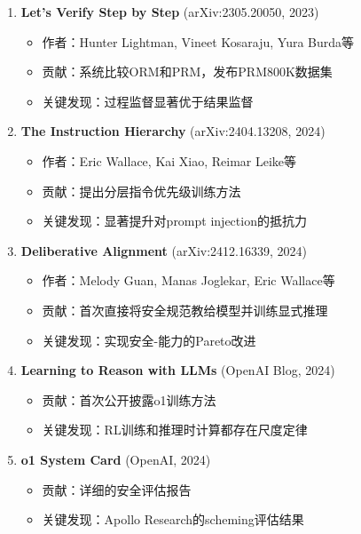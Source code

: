 \documentclass[12pt,a4paper]{article}
\begin{document}
\begin{enumerate}
    \item \textbf{Let's Verify Step by Step} (arXiv:2305.20050, 2023)
    \begin{itemize}
        \item 作者：Hunter Lightman, Vineet Kosaraju, Yura Burda等
        \item 贡献：系统比较ORM和PRM，发布PRM800K数据集
        \item 关键发现：过程监督显著优于结果监督
    \end{itemize}
    
    \item \textbf{The Instruction Hierarchy} (arXiv:2404.13208, 2024)
    \begin{itemize}
        \item 作者：Eric Wallace, Kai Xiao, Reimar Leike等
        \item 贡献：提出分层指令优先级训练方法
        \item 关键发现：显著提升对prompt injection的抵抗力
    \end{itemize}
    
    \item \textbf{Deliberative Alignment} (arXiv:2412.16339, 2024)
    \begin{itemize}
        \item 作者：Melody Guan, Manas Joglekar, Eric Wallace等
        \item 贡献：首次直接将安全规范教给模型并训练显式推理
        \item 关键发现：实现安全-能力的Pareto改进
    \end{itemize}
    
    \item \textbf{Learning to Reason with LLMs} (OpenAI Blog, 2024)
    \begin{itemize}
        \item 贡献：首次公开披露o1训练方法
        \item 关键发现：RL训练和推理时计算都存在尺度定律
    \end{itemize}
    
    \item \textbf{o1 System Card} (OpenAI, 2024)
    \begin{itemize}
        \item 贡献：详细的安全评估报告
        \item 关键发现：Apollo Research的scheming评估结果
    \end{itemize}
\end{enumerate}
\end{document}

